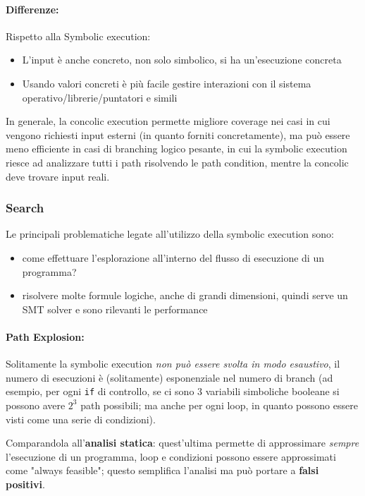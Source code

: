 \paragraph{Differenze:} Rispetto alla Symbolic execution: 
\begin{itemize}
    \item L'input è anche concreto, non solo simbolico, si ha un'esecuzione concreta
    
    \item Usando valori concreti è più facile gestire interazioni con il sistema operativo/librerie/puntatori e simili
\end{itemize}

In generale, la concolic execution permette migliore coverage nei casi in cui vengono richiesti input esterni (in quanto forniti concretamente), ma può essere meno efficiente in casi di branching logico pesante, in cui la symbolic execution riesce ad analizzare tutti i path risolvendo le path condition, mentre la concolic deve trovare input reali.

\subsubsection{Search}

Le principali problematiche legate all'utilizzo della symbolic execution sono:
\begin{itemize}
	\item come effettuare l'esplorazione all'interno del flusso di esecuzione di un programma?

	\item risolvere molte formule logiche, anche di grandi dimensioni, quindi serve un SMT solver e sono rilevanti le performance
\end{itemize}

\paragraph{Path Explosion:} Solitamente la symbolic execution \textit{non può essere svolta in modo esaustivo}, il numero di esecuzioni è (solitamente) esponenziale nel numero di branch (ad esempio, per ogni \texttt{if} di controllo, se ci sono 3 variabili simboliche booleane si possono avere $2^3$ path possibili; ma anche per ogni loop, in quanto possono essere visti come una serie di condizioni).

Comparandola all'\textbf{analisi statica}: quest'ultima permette di approssimare \textit{sempre} l'esecuzione di un programma, loop e condizioni possono essere approssimati come "always feasible"; questo semplifica l'analisi ma può portare a \textbf{falsi positivi}. 


